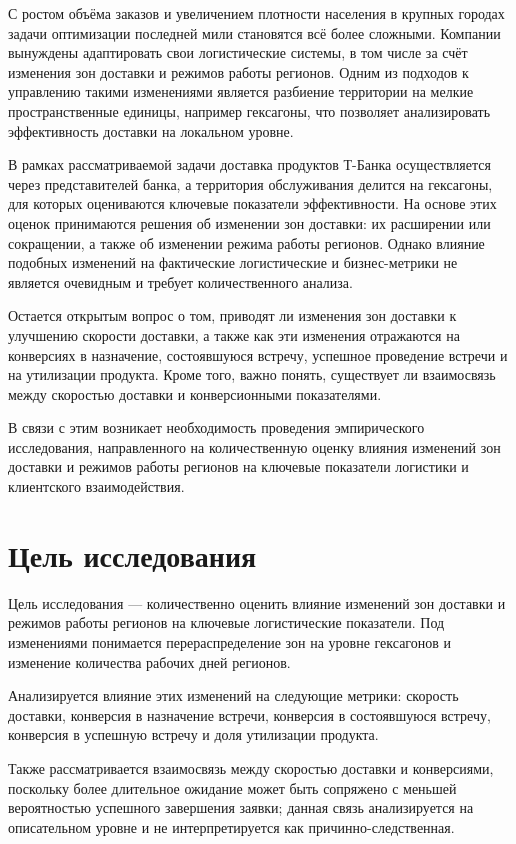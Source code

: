\documentclass[14pt,a4paper]{extarticle}
\begin{document}
С ростом объёма заказов и увеличением плотности населения в крупных городах задачи оптимизации последней мили становятся всё более сложными. Компании вынуждены адаптировать свои логистические системы, в том числе за счёт изменения зон доставки и режимов работы регионов. Одним из подходов к управлению такими изменениями является разбиение территории на мелкие пространственные единицы, например гексагоны, что позволяет анализировать эффективность доставки на локальном уровне.

В рамках рассматриваемой задачи доставка продуктов Т-Банка осуществляется через представителей банка, а территория обслуживания делится на гексагоны, для которых оцениваются ключевые показатели эффективности. На основе этих оценок принимаются решения об изменении зон доставки: их расширении или сокращении, а также об изменении режима работы регионов. Однако влияние подобных изменений на фактические логистические и бизнес-метрики не является очевидным и требует количественного анализа.

Остается открытым вопрос о том, приводят ли изменения зон доставки к улучшению скорости доставки, а также как эти изменения отражаются на конверсиях в назначение, состоявшуюся встречу, успешное проведение встречи и на утилизации продукта. Кроме того, важно понять, существует ли взаимосвязь между скоростью доставки и конверсионными показателями.

В связи с этим возникает необходимость проведения эмпирического исследования, направленного на количественную оценку влияния изменений зон доставки и режимов работы регионов на ключевые показатели логистики и клиентского взаимодействия.

\section{Цель исследования}

Цель исследования --- количественно оценить влияние изменений зон доставки и режимов работы регионов на ключевые логистические показатели. Под изменениями понимается перераспределение зон на уровне гексагонов и изменение количества рабочих дней регионов.

Анализируется влияние этих изменений на следующие метрики: скорость доставки, конверсия в назначение встречи, конверсия в состоявшуюся встречу, конверсия в успешную встречу и доля утилизации продукта.

Также рассматривается взаимосвязь между скоростью доставки и конверсиями, поскольку более длительное ожидание может быть сопряжено с меньшей вероятностью успешного завершения заявки; данная связь анализируется на описательном уровне и не интерпретируется как причинно-следственная.
\end{document}
